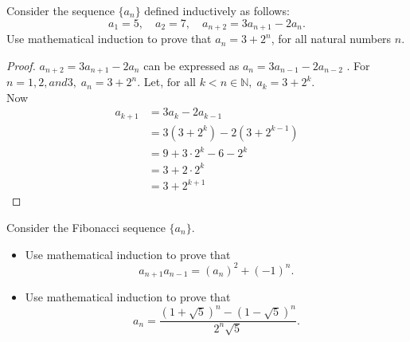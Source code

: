 \documentclass[12pt]{article}
\newenvironment{problem}[2][Problem]{\begin{trivlist}
\item[\hskip \labelsep {\bfseries #1}\hskip \labelsep {\bfseries #2.}]}{\end{trivlist}}
\begin{document}
\begin{problem}{12}
Consider the sequence \( \{a_n\} \) defined inductively as follows:
\[
a_1 = 5, \quad a_2 = 7, \quad a_{n+2} = 3a_{n+1} - 2a_n.
\]
Use mathematical induction to prove that \( a_n = 3 + 2^n \), for all natural numbers \( n \).

\end{problem}

\begin{proof}
$a_{n+2} = 3a_{n+1} - 2a_n$ can be expressed as $a_n = 3a_{n-1} - 2a_{n-2}$ .
For $n = 1, 2, and 3, \; a_n = 3 + 2^n$. Let, $\text{for all } k < n \in \mathbb{N}, \; a_k = 3 + 2^k$. \\
Now
\begin{align*}
a_{k+1} & = 3a_k - 2a_{k-1} \\
& = 3(3+2^k) - 2(3+2^{k-1}) \\
& = 9 + 3\cdot 2^k - 6 - 2^k \\
& = 3 + 2\cdot 2^k \\
& = 3 + 2^{k+1}
\end{align*}

\end{proof}

\begin{problem}{13}
Consider the Fibonacci sequence \( \{a_n\} \).

\begin{itemize}
    \item[(a)] Use mathematical induction to prove that
    \[
    a_{n+1} a_{n-1} = (a_n)^2 + (-1)^n.
    \]
    
    \item[(b)] Use mathematical induction to prove that
    \[
    a_n = \frac{(1 + \sqrt{5})^n - (1 - \sqrt{5})^n}{2^n \sqrt{5}}.
    \]
\end{itemize}

\end{problem}
\end{document}

